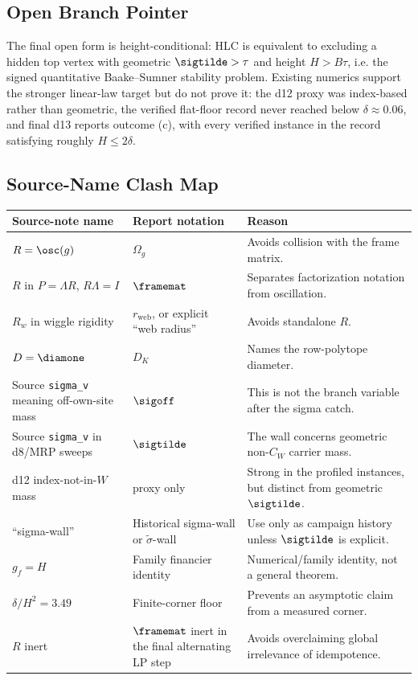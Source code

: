 \subsection{Open Branch Pointer}

The final open form is height-conditional: HLC is equivalent to excluding a hidden top vertex with geometric \(\sigtilde>\tau\) and height \(H>B\tau\), i.e. the signed quantitative Baake--Sumner stability problem.  Existing numerics support the stronger linear-law target but do not prove it: the d12 proxy was index-based rather than geometric, the verified flat-floor record never reached below \(\delta\approx0.06\), and final d13 reports outcome (c), with every verified instance in the record satisfying roughly \(H\le2\delta\).

\subsection{Source-Name Clash Map}

\small
\begin{longtable}{>{\raggedright\arraybackslash}p{}>{\raggedright\arraybackslash}p{}>{\raggedright\arraybackslash}p{}}
\toprule
Source-note name & Report notation & Reason\\
\midrule
\endhead
\(R=\osc(g)\) & \(\Omega_g\) & Avoids collision with the frame matrix.\\
\(R\) in \(P=\Lambda R\), \(R\Lambda=I\) & \(\framemat\) & Separates factorization notation from oscillation.\\
\(R_w\) in wiggle rigidity & \(r_{\mathrm{web}}\), or explicit ``web radius'' & Avoids standalone \(R\).\\
\(D=\diamone\) & \(D_K\) & Names the row-polytope diameter.\\
Source \texttt{sigma\_v} meaning off-own-site mass & \(\sigoff\) & This is not the branch variable after the sigma catch.\\
Source \texttt{sigma\_v} in d8/MRP sweeps & \(\sigtilde\) & The wall concerns geometric non-\(C_W\) carrier mass.\\
d12 index-not-in-\(W\) mass & proxy only & Strong in the profiled instances, but distinct from geometric \(\sigtilde\).\\
``sigma-wall'' & Historical sigma-wall or \(\widetilde\sigma\)-wall & Use only as campaign history unless \(\sigtilde\) is explicit.\\
\(g_f=H\) & Family financier identity & Numerical/family identity, not a general theorem.\\
\(\delta/H^2=3.49\) & Finite-corner floor & Prevents an asymptotic claim from a measured corner.\\
\(R\) inert & \(\framemat\) inert in the final alternating LP step & Avoids overclaiming global irrelevance of idempotence.\\
\bottomrule
\end{longtable}
\normalsize
